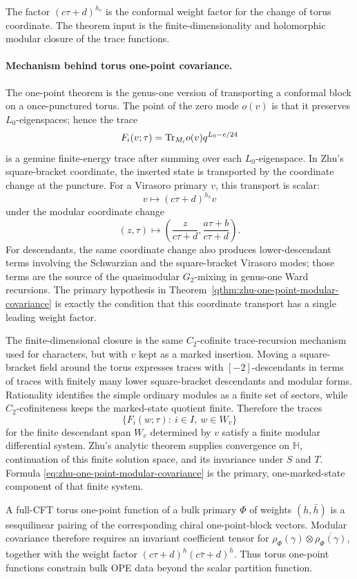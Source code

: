 The factor \((c\tau+d)^{h_v}\) is the conformal weight factor for the
change of torus coordinate.  The theorem input is the finite-dimensionality
and holomorphic modular closure of the trace functions.

\paragraph{Mechanism behind torus one-point covariance.}
The one-point theorem is the genus-one version of transporting a conformal
block on a once-punctured torus.  The point of the zero mode \(o(v)\) is that
it preserves \(L_0\)-eigenspaces; hence the trace
\[
  F_i(v;\tau)=
  {\rm Tr}_{M_i}o(v)q^{L_0-c/24}
\]
is a genuine finite-energy trace after summing over each \(L_0\)-eigenspace.
In Zhu's square-bracket coordinate, the inserted state is transported by the
coordinate change at the puncture.  For a Virasoro primary \(v\), this
transport is scalar:
\[
  v\longmapsto (c\tau+d)^{h_v}v
\]
under the modular coordinate change
\[
  (z,\tau)\longmapsto
  \left(\frac{z}{c\tau+d},\frac{a\tau+b}{c\tau+d}\right).
\]
For descendants, the same coordinate change also produces lower-descendant
terms involving the Schwarzian and the square-bracket Virasoro modes; those
terms are the source of the quasimodular \(G_2\)-mixing in genus-one Ward
recursions.  The primary hypothesis in
Theorem~\ref{qthm:zhu-one-point-modular-covariance} is exactly the condition
that this coordinate transport has a single leading weight factor.

The finite-dimensional closure is the same \(C_2\)-cofinite trace-recursion
mechanism used for characters, but with \(v\) kept as a marked insertion.
Moving a square-bracket field around the torus expresses traces with
\([-2]\)-descendants in terms of traces with finitely many lower
square-bracket descendants and modular forms.  Rationality identifies the
simple ordinary modules as a finite set of sectors, while \(C_2\)-cofiniteness
keeps the marked-state quotient finite.  Therefore the traces
\[
  \{F_i(w;\tau):\ i\in I,\ w\in W_v\}
\]
for the finite descendant span \(W_v\) determined by \(v\) satisfy a finite
modular differential system.  Zhu's analytic theorem supplies convergence on
\(\mathbb H\), continuation of this finite solution space, and its invariance
under \(S\) and \(T\).  Formula
\eqref{eq:zhu-one-point-modular-covariance} is the primary, one-marked-state
component of that finite system.

A full-CFT torus one-point function of a bulk primary \(\Phi\) of weights
\((h,\bar h)\) is a sesquilinear pairing of the corresponding chiral
one-point-block vectors.  Modular covariance therefore requires an invariant
coefficient tensor for
\(\rho_\Phi(\gamma)\otimes \overline{\rho_\Phi(\gamma)}\), together with the
weight factor \((c\tau+d)^h(c\bar\tau+d)^{\bar h}\).  Thus torus one-point
functions constrain bulk OPE data beyond the scalar partition function.

